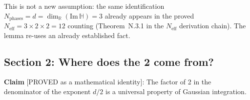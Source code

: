 \documentclass[11pt,a4paper]{article}
\theoremstyle{definition}
\theoremstyle{remark}
\begin{document}
This is not a new assumption: the same identification
$N_{\mathrm{phases}} = d = \dim_\mathbb{R}(\mathrm{Im}\,\mathbb{H}) = 3$
already appears in the proved $N_{\mathrm{eff}} = 3 \times 2 \times 2 = 12$
counting (Theorem~N.3.1 in the $N_{\mathrm{eff}}$ derivation chain).
The lemma re-uses an already established fact.

\subsection{Section 2: Where does the 2 come from?}
\label{sec:two}

\textbf{Claim} [PROVED as a mathematical identity]: The factor of 2 in the
denominator of the exponent $d/2$ is a universal property of Gaussian integration.
\end{document}
